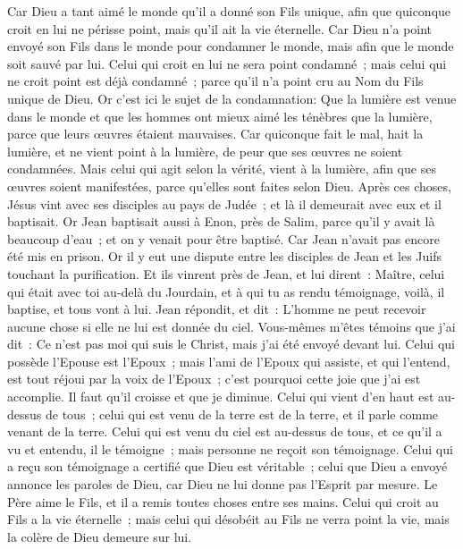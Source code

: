 \begin{multicols}{2}
Car Dieu a tant aimé le monde qu'il a donné son Fils unique, afin que quiconque croit en lui ne périsse point, mais qu'il ait la vie éternelle.
Car Dieu n'a point envoyé son Fils dans le monde pour condamner le monde, mais afin que le monde soit sauvé par lui.
Celui qui croit en lui ne sera point condamné~; mais celui qui ne croit point est déjà condamné~; parce qu'il n'a point cru au Nom du Fils unique de Dieu.
Or c'est ici le sujet de la condamnation: Que la lumière est venue dans le monde et que les hommes ont mieux aimé les ténèbres que la lumière, parce que leurs œuvres étaient mauvaises.
Car quiconque fait le mal, hait la lumière, et ne vient point à la lumière, de peur que ses œuvres ne soient condamnées.
Mais celui qui agit selon la vérité, vient à la lumière, afin que ses œuvres soient manifestées, parce qu'elles sont faites selon Dieu.
Après ces choses, Jésus vint avec ses disciples au pays de Judée~; et là il demeurait avec eux et il baptisait.
Or Jean baptisait aussi à Enon, près de Salim, parce qu'il y avait là beaucoup d'eau~; et on y venait pour être baptisé.
Car Jean n'avait pas encore été mis en prison.
Or il y eut une dispute entre les disciples de Jean et les Juifs touchant la purification.
Et ils vinrent près de Jean, et lui dirent~: Maître, celui qui était avec toi au-delà du Jourdain, et à qui tu as rendu témoignage, voilà, il baptise, et tous vont à lui.
Jean répondit, et dit~: L'homme ne peut recevoir aucune chose si elle ne lui est donnée du ciel.
Vous-mêmes m'êtes témoins que j'ai dit~: Ce n'est pas moi qui suis le Christ, mais j'ai été envoyé devant lui.
Celui qui possède l'Epouse est l'Epoux~; mais l'ami de l'Epoux qui assiste, et qui l'entend, est tout réjoui par la voix de l'Epoux~; c'est pourquoi cette joie que j'ai est accomplie.
Il faut qu'il croisse et que je diminue.
Celui qui vient d'en haut est au-dessus de tous~; celui qui est venu de la terre est de la terre, et il parle comme venant de la terre. Celui qui est venu du ciel est au-dessus de tous,
et ce qu'il a vu et entendu, il le témoigne~; mais personne ne reçoit son témoignage.
Celui qui a reçu son témoignage a certifié que Dieu est véritable~;
celui que Dieu a envoyé annonce les paroles de Dieu, car Dieu ne lui donne pas l'Esprit par mesure.
Le Père aime le Fils, et il a remis toutes choses entre ses mains.
Celui qui croit au Fils a la vie éternelle~; mais celui qui désobéit au Fils ne verra point la vie, mais la colère de Dieu demeure sur lui.

\end{multicols}
